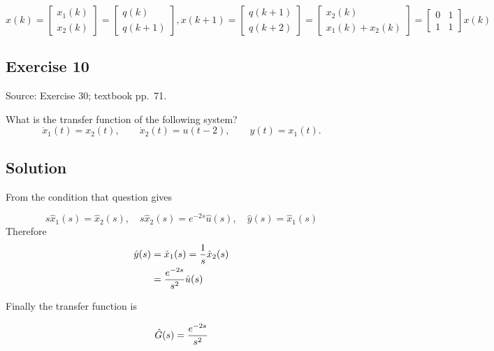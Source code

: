 \documentclass[12pt,a4paper]{article}
\newlength{\questionroom}
\newenvironment{questionprompt}{%
  \begin{lrbox}{\questionbox}\begin{minipage}{\linewidth}%
}{%
  \end{minipage}\end{lrbox}%
  \setlength{\questionroom}{\dimexpr\ht\questionbox+\dp\questionbox+5.2cm\relax}%
  \ifdim\questionroom>\textheight\setlength{\questionroom}{\textheight}\fi
  \Needspace{\questionroom}%
  \noindent\usebox{\questionbox}\par
}
\begin{document}
\[
x(k) = \begin{bmatrix}
	x_1(k) \\ x_2(k)
\end{bmatrix} = \begin{bmatrix}
	q(k) \\ q(k + 1)
\end{bmatrix}, x(k + 1) = \begin{bmatrix}
q(k + 1) \\ q(k + 2) 
\end{bmatrix} = \begin{bmatrix}
x_2(k) \\ x_1(k) + x_2(k)
\end{bmatrix} = \begin{bmatrix}
0 & 1 \\ 1 & 1
\end{bmatrix} x(k)
\]

\vspace{3.5cm}


\begin{questionprompt}
\section*{Exercise 10}
\label{practice:10}
{\small Source: Exercise 30; textbook pp.~71.}\par
What is the transfer function of the following system?
\[\dot x_1(t)=x_2(t),\qquad\dot x_2(t)=u(t-2),\qquad y(t)=x_1(t).\]
\end{questionprompt}
\subsection*{Solution}

From the condition that question gives

\[
s\hat x_1(s) = \hat x_2(s), \quad s\hat x_2(s) = e^{-2s}\hat u(s), \quad \hat y(s) =\hat x_1(s)
\]
Therefore 
\begin{align*}
	\hat y(s) &= \hat x_1(s) = {1\over s} \hat x_2(s)  \\
	&= {e^{-2s} \over s^2} \hat u(s)
\end{align*}

Finally the transfer function is

\[
\hat G(s) = {e^{-2s}\over s^2}
\]

\vspace{3.5cm}
\end{document}
